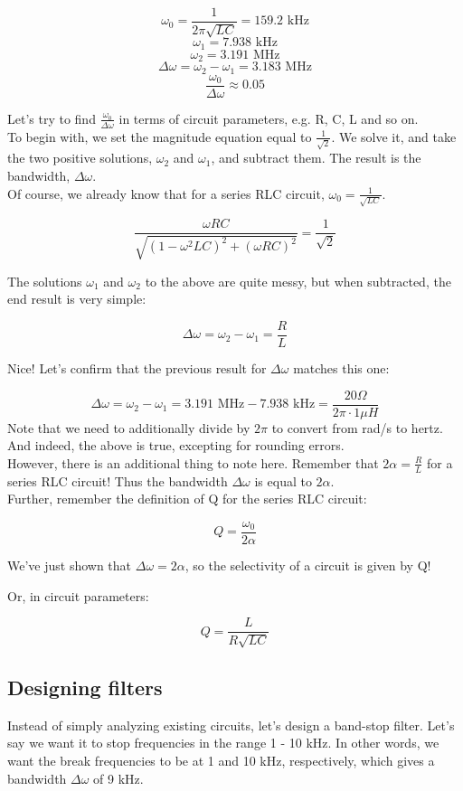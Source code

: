 \documentclass[12pt,a4paper]{report}
\begin{document}
\[ \omega_0 = \frac{1}{2\pi \sqrt{LC}} = 159.2 \text{ kHz} \]
\[ \omega_1 = 7.938 \text{ kHz} \]
\[ \omega_2 = 3.191 \text { MHz} \]
\[ \Delta \omega = \omega_2 - \omega_1 = 3.183 \text{ MHz} \]
\[ \frac{\omega_0}{\Delta \omega} \approx 0.05 \]

Let's try to find $\displaystyle \frac{\omega_0}{\Delta \omega}$ in terms of circuit parameters, e.g. R, C, L and so on.\\
To begin with, we set the magnitude equation equal to $\displaystyle \frac{1}{\sqrt{2}}$. We solve it, and take the two positive solutions, $\omega_2$ and $\omega_1$, and subtract them. The result is the bandwidth, $\Delta \omega$.\\
Of course, we already know that for a series RLC circuit, $\displaystyle \omega_0 = \frac{1}{\sqrt{LC}}$.

\[ \frac{\omega RC}{\sqrt{(1 - \omega^2 LC)^2 + (\omega RC)^2}} = \frac{1}{\sqrt{2}} \]

The solutions $\omega_1$ and $\omega_2$ to the above are quite messy, but when subtracted, the end result is very simple:

\[ \Delta \omega = \omega_2 - \omega_1 = \frac{R}{L} \]

Nice! Let's confirm that the previous result for $\Delta \omega$ matches this one:

\[ \Delta \omega = \omega_2 - \omega_1 = 3.191 \text{ MHz} - 7.938 \text{ kHz} = \frac{20 \Omega}{2\pi \cdot 1 \mu H} \]
Note that we need to additionally divide by $2 \pi$ to convert from rad/s to hertz. And indeed, the above is true, excepting for rounding errors.\\
However, there is an additional thing to note here. Remember that $\displaystyle 2 \alpha = \frac{R}{L}$ for a series RLC circuit! Thus the bandwidth $\Delta \omega$ is equal to $2 \alpha$.\\
Further, remember the definition of Q for the series RLC circuit:

\[ Q = \frac{\omega_0}{2\alpha} \]

We've just shown that $\Delta \omega = 2 \alpha$, so the selectivity of a circuit is given by Q!

Or, in circuit parameters:

\[ Q = \frac{L}{R \sqrt{LC}} \]


\subsection{Designing filters}
Instead of simply analyzing existing circuits, let's design a band-stop filter. Let's say we want it to stop frequencies in the range 1 - 10 kHz. In other words, we want the break frequencies to be at 1 and 10 kHz, respectively, which gives a bandwidth $\Delta \omega$ of 9 kHz.\\
\end{document}
